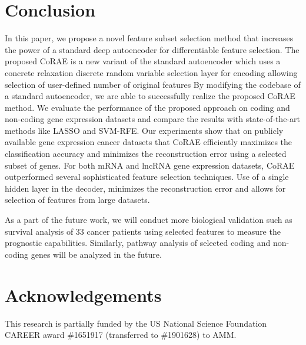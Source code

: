 \documentclass{bioinfo}
\begin{document}
\section{Conclusion}
In this paper, we propose a novel feature subset selection method that increases the power of a standard deep autoencoder for differentiable feature selection. 
The proposed CoRAE is a new variant of the standard autoencoder which uses a concrete relaxation discrete random variable selection layer for encoding allowing selection of user-defined number of original features
By modifying the codebase of a standard autoencoder, we are able to successfully realize the proposed CoRAE method.
We evaluate the performance of the proposed approach on coding and non-coding gene expression datasets and compare the results with state-of-the-art methods like LASSO and SVM-RFE.
Our experiments show that on publicly available gene expression cancer datasets that CoRAE efficiently maximizes the classification accuracy and minimizes the reconstruction error using a selected subset of genes.
For both mRNA and lncRNA gene expression datasets, CoRAE outperformed several sophisticated feature selection techniques.
Use of a single hidden layer in the decoder, minimizes the reconstruction error and allows for selection of features from large datasets.

As a part of the future work, we will conduct more biological validation such as survival analysis of 33 cancer patients using selected features to measure the prognostic capabilities.
Similarly, pathway analysis of selected coding and non-coding genes will be analyzed in the future.

\section*{Acknowledgements}


This research is partially funded by the US National Science Foundation CAREER award \#1651917 (transferred to \#1901628) to AMM.

%
%
%
%


\end{document}
